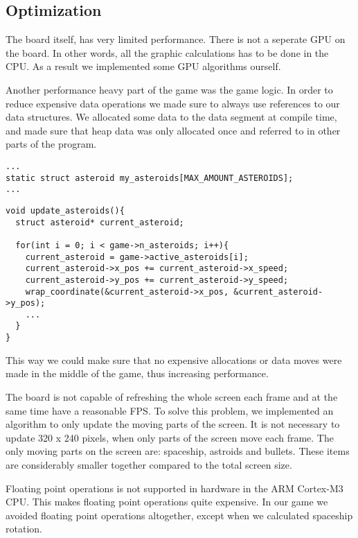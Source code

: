 \subsection{Optimization}
The board itself, has very limited performance. There is not a seperate GPU on the board. In other words, all the graphic calculations has to be done in the CPU. As a result we implemented some GPU algorithms ourself. 

Another performance heavy part of the game was the game logic. In order to reduce expensive data operations we made sure to always use references to our data structures. We allocated some data to the data segment at compile time, and made sure that heap data was only allocated once and referred to in other parts of the program.

\begin{lstlisting}[caption=Allocating asteroid data on data segment.,label=lst:Asteroid allocation]
...
static struct asteroid my_asteroids[MAX_AMOUNT_ASTEROIDS];
...
\end{lstlisting}

\begin{lstlisting}[caption=Updating the asteroids using their references.,label=lst:Asteroid updating]
void update_asteroids(){
  struct asteroid* current_asteroid;

  for(int i = 0; i < game->n_asteroids; i++){
    current_asteroid = game->active_asteroids[i];
    current_asteroid->x_pos += current_asteroid->x_speed;
    current_asteroid->y_pos += current_asteroid->y_speed;
    wrap_coordinate(&current_asteroid->x_pos, &current_asteroid->y_pos);
    ...
  }
}
\end{lstlisting}

This way we could make sure that no expensive allocations or data moves were made in the middle of the game, thus increasing performance.

The board is not capable of refreshing the whole screen each frame and at the same time have a reasonable FPS. To solve this problem, we implemented an algorithm to only update the moving parts of the screen. It is not necessary to update 320 x 240 pixels, when only parts of the screen move each frame. The only moving parts on the screen are: spaceship, astroids and bullets. These items are considerably smaller together compared to the total screen size.

Floating point operations is not supported in hardware in the ARM Cortex-M3 CPU. This makes floating point operations quite expensive. In our game we avoided floating point operations altogether, except when we calculated spaceship rotation.

